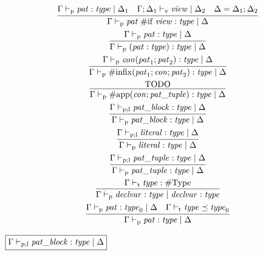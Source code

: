 \begin{gather*}
    \infer{\Gamma \vdash_\mathrm{p} \mathit{pat}\; \mathrm{\#if}\; \mathit{view}: \mathit{type} \mid \Delta}{
        \Gamma \vdash_\mathrm{p} \mathit{pat}: \mathit{type} \mid \Delta_1
        &
        \Gamma; \Delta_1 \vdash_\mathrm{v} \mathit{view} \mid \Delta_2
        &
        \Delta = \Delta_1; \Delta_2
    }
    \\
    \infer{\Gamma \vdash_\mathrm{p} (\mathit{pat}: \mathit{type}): \mathit{type} \mid \Delta}{
        \Gamma \vdash_\mathrm{p} \mathit{pat}: \mathit{type} \mid \Delta
    }
    \\
    \infer{\Gamma \vdash_\mathrm{p} \mathrm{\#infix}(\mathit{pat}_1; \mathit{con}; \mathit{pat}_2): \mathit{type} \mid \Delta}{
        \Gamma \vdash_\mathrm{p} \mathit{con}(\mathit{pat}_1; \mathit{pat}_2): \mathit{type} \mid \Delta
    }
    \\
    \infer{\Gamma \vdash_\mathrm{p} \mathrm{\#app}(\mathit{con}; \mathit{pat\_tuple}): \mathit{type} \mid \Delta}{
        \text{TODO}
    }
    \\
    \infer{\Gamma \vdash_\mathrm{p} \mathit{pat\_block}: \mathit{type} \mid \Delta}{
        \Gamma \vdash_{\mathrm{p}; \mathrm{l}} \mathit{pat\_block}: \mathit{type} \mid \Delta
    }
    \\
    \infer{\Gamma \vdash_\mathrm{p} \mathit{literal}: \mathit{type} \mid \Delta}{
        \Gamma \vdash_{\mathrm{p}; \mathrm{l}} \mathit{literal}: \mathit{type} \mid \Delta
    }
    \\
    \infer{\Gamma \vdash_\mathrm{p} \mathit{pat\_tuple}: \mathit{type} \mid \Delta}{
        \Gamma \vdash_{\mathrm{p}; \mathrm{l}} \mathit{pat\_tuple}: \mathit{type} \mid \Delta
    }
    \\
    \infer{\Gamma \vdash_\mathrm{p} \mathit{declvar}: \mathit{type} \mid \mathit{declvar}: \mathit{type}}{
        \Gamma \vdash_\mathrm{t} \mathit{type}: \mathrm{\#Type}
    }
    \\
    \infer{\Gamma \vdash_\mathrm{p} \mathit{pat}: \mathit{type} \mid \Delta}{
        \Gamma \vdash_\mathrm{p} \mathit{pat}: \mathit{type}_0 \mid \Delta
        &
        \Gamma \vdash_\mathrm{t} \mathit{type} \preceq \mathit{type}_0
    }
\end{gather*}

$\fbox{$\Gamma \vdash_{\mathrm{p}; \mathrm{l}} \mathit{pat\_block}: \mathit{type} \mid \Delta$}$


